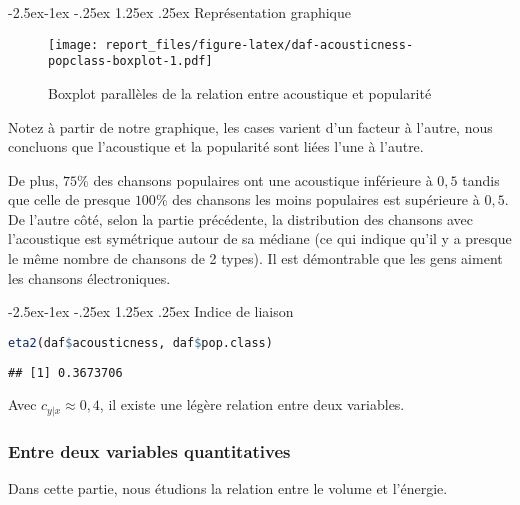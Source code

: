 \documentclass[
  12pt,
  xcolor = usenames,dvipsnames]{article}
\makeatletter
\renewcommand\paragraph{\@startsection{paragraph}{4}{\z@}%
        {-2.5ex\@plus -1ex \@minus -.25ex}%
        {1.25ex \@plus .25ex}%
        {\normalfont\normalsize\bfseries}}
\makeatother
\begin{document}
\hypertarget{repruxe9sentation-graphique}{%
\paragraph{Représentation graphique}\label{repruxe9sentation-graphique}}

\begin{figure}
\centering
\texttt{[image: report\_files/figure-latex/daf-acousticness-popclass-boxplot-1.pdf]}
\caption{\label{fig:daf-acousticness-popclass-boxplot}Boxplot parallèles de la relation entre acoustique et popularité}
\end{figure}

Notez à partir de notre graphique, les cases varient d'un facteur à l'autre,
nous concluons que l'acoustique et la popularité sont liées l'une à l'autre.

De plus, \(75\%\) des chansons populaires ont une acoustique inférieure à \(0,5\) tandis que celle de presque \(100\%\) des chansons les moins populaires est supérieure à \(0,5\).
De l'autre côté, selon la partie précédente, la distribution des chansons avec l'acoustique est symétrique autour de sa médiane (ce qui indique qu'il y a presque le même nombre de chansons de 2 types).
Il est démontrable que les gens aiment les chansons électroniques.

\hypertarget{indice-de-liaison}{%
\paragraph{Indice de liaison}\label{indice-de-liaison}}

\begin{lstlisting}[language=R]
eta2(daf$acousticness, daf$pop.class)
\end{lstlisting}

\begin{lstlisting}
## [1] 0.3673706
\end{lstlisting}

Avec \(c_{y|x} \approx 0,4\), il existe une légère relation entre deux variables.

\hypertarget{entre-deux-variables-quantitatives}{%
\subsubsection{Entre deux variables quantitatives}\label{entre-deux-variables-quantitatives}}

Dans cette partie, nous étudions la relation entre le volume et l'énergie.
\end{document}
